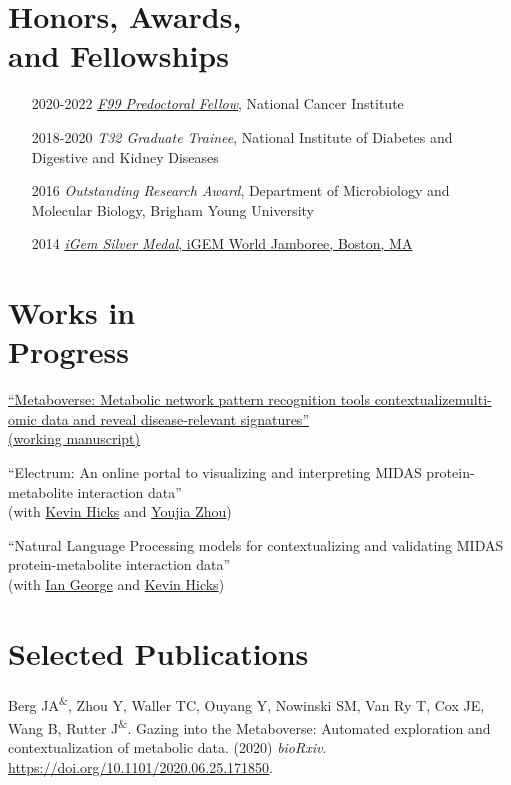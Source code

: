 \documentclass[margin,line]{res}
\begin{document}
\begin{resume}
\section{\sc Honors, Awards, \\and Fellowships}
\begin{itemize}[style=multiline,leftmargin=2.2cm,font=\normalfont]
\item[2020-2022] \textit{\href{https://github.com/j-berg/NCI_F99_application/blob/main/Berg-Jordan_NCI-F99_2019-application_Redacted.pdf}{F99 Predoctoral Fellow}}, National Cancer Institute
\item[2018-2020] \textit{T32 Graduate Trainee}, National Institute of Diabetes and Digestive and Kidney Diseases
\item[2016] \textit{Outstanding Research Award}, Department of Microbiology and Molecular Biology, Brigham Young University
\item[2014] \href{http://2014.igem.org/Team:BYU_Provo}{\textit{iGem Silver Medal}, iGEM World Jamboree, Boston, MA}
\end{itemize}


\section{\sc Works in \\Progress}
\href{https://metaboverse.readthedocs.io/en/latest/}{``Metaboverse: Metabolic network pattern recognition tools contextualizemulti-omic data and reveal disease-relevant signatures''} \\
\href{https://www.overleaf.com/project/5f831698b9237b0001a5ae60}{(working manuscript)}

``Electrum: An online portal to visualizing and interpreting MIDAS protein-metabolite interaction data'' \\
(with \href{https://github.com/KGHicks}{Kevin Hicks} and \href{https://github.com/zhou325}{Youjia Zhou})

``Natural Language Processing models for contextualizing and validating MIDAS protein-metabolite interaction data'' \\
(with \href{https://github.com/ig-ghub}{Ian George} and \href{https://github.com/KGHicks}{Kevin Hicks})


\section{\sc Selected Publications}
Berg JA\textsuperscript{\&}, Zhou Y, Waller TC, Ouyang Y, Nowinski SM, Van Ry T, Cox JE, Wang B, Rutter J\textsuperscript{\&}. Gazing into the Metaboverse: Automated exploration and contextualization of metabolic data. (2020) \textit{bioRxiv}. \href{https://www.biorxiv.org/content/10.1101/2020.06.25.171850v1}{https://doi.org/10.1101/2020.06.25.171850}.


\end{resume}
\end{document}
